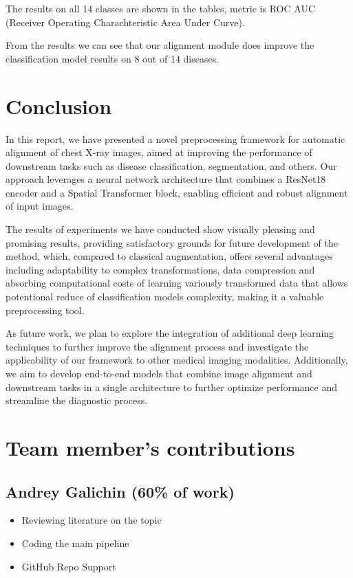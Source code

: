 \documentclass{article}
\begin{document}
The results on all 14 classes are shown in the tables, metric is 
ROC AUC (Receiver Operating Charachteristic Area Under Curve).

From the results we can see that our alignment module does improve the classification 
model results on 8 out of 14 diseases.


\section{Conclusion}\label{conclusion}
In this report, we have presented a novel preprocessing framework for automatic 
alignment of chest X-ray images, aimed at improving the performance of 
downstream tasks such as disease classification, segmentation, and others. Our 
approach leverages a neural network architecture that combines a ResNet18 
encoder and a Spatial Transformer block, enabling efficient and robust 
alignment of input images.

The results of experiments we have conducted show visually pleasing and 
promising results, providing satisfactory grounds for future development of the 
method, which, compared to classical augmentation, offers several advantages
including adaptability to complex transformations, data compression and 
absorbing computational costs of learning variously transformed data that 
allows potentional reduce of classification models complexity, making it a 
valuable preprocessing tool.

As future work, we plan to explore the integration of additional deep learning 
techniques to further improve the alignment process and investigate the 
applicability of our framework to other medical imaging modalities. 
Additionally, we aim to develop end-to-end models that combine image alignment 
and downstream tasks in a single architecture to further optimize performance 
and streamline the diagnostic process.



\clearpage

\newpage
\appendix
\section{Team member's contributions}
\label{appendix-contrib}

\subsection*{Andrey Galichin (60\% of work)}
\begin{itemize}
    \item Reviewing literature on the topic
    \item Coding the main pipeline
    \item GitHub Repo Support
\end{itemize}
\end{document}
